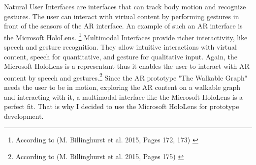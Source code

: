 \documentclass[12pt,a4paper,oneside,american,parskip=half]{article}
\begin{document}
\begin{justify}
\begin{normalsize}
\newline
Natural User Interfaces are interfaces that can track body motion and recognize gestures. The user can interact with virtual content by performing gestures in front of the sensors of the AR interface. An example of such an AR interface is the Microsoft HoloLens.
\footnote{According to (M. Billinghurst et al. 2015, Pages 172, 173) \cite{interfaces}}
\newline
Multimodal Interfaces provide richer interactivity, like speech and gesture recognition. They allow intuitive interactions with virtual content, speech for quantitative, and gesture for qualitative input. Again, the Microsoft HoloLens is a representant thus it enables the user to interact with AR content by speech and gestures.\footnote{According to (M. Billinghurst et al. 2015, Pages 175) \cite{interfaces}}
\newline
Since the AR prototype "The Walkable Graph" needs the user to be in motion, exploring the AR content on a walkable graph and interacting with it, a multimodal interface like the Microsoft HoloLens is a perfect fit. That is why I decided to use the Microsoft HoloLens for prototype development.

\end{normalsize}
\end{justify}
\end{document}
